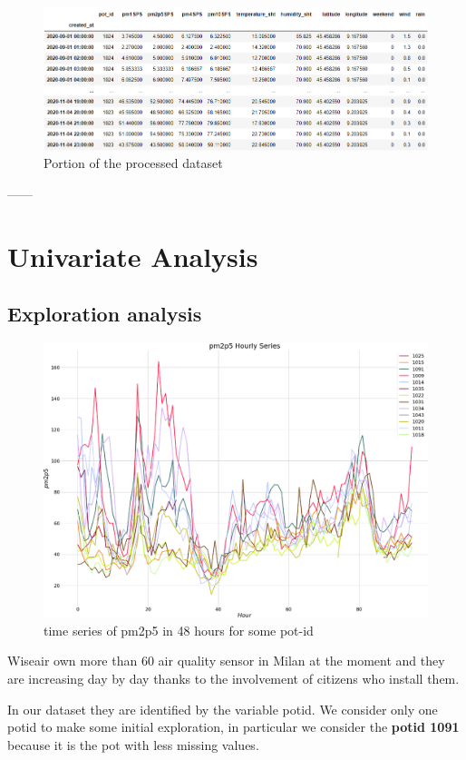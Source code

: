 \documentclass{article}
\begin{document}
\begin{figure}[h!]
  \centering
  \includegraphics[width=5in]{dataset.png}
  \caption{Portion of the processed dataset}
\end{figure}


------
\newpage
\section{\textbf{Univariate Analysis}}
\subsection{Exploration analysis}
\begin{figure}[h!]
    \centering
    \includegraphics[scale=0.3]{plotDati.png}
    \caption{time series of pm2p5 in 48 hours for some pot-id}
\end{figure}

Wiseair own more than 60 air quality sensor in Milan at the moment and they are increasing day by day thanks to the involvement of citizens who install them. 

In our dataset they are identified by the variable potid. 
We consider only one potid to make some initial exploration, in particular we consider the \textbf{potid 1091} because it is the pot with less missing values.
\end{document}
